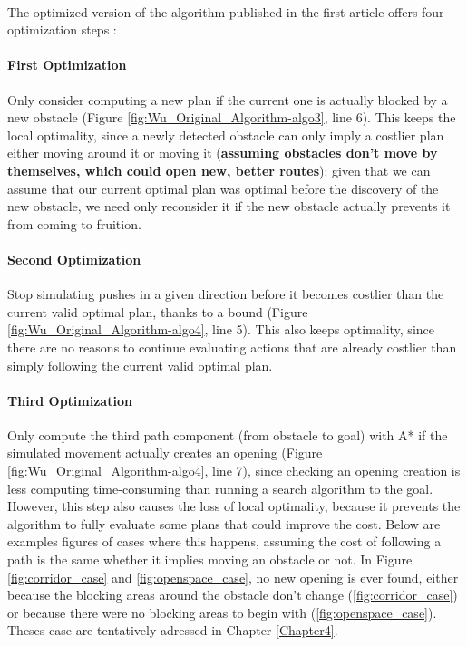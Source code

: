 \paragraph{} The optimized version of the algorithm published in the first article offers four optimization steps :

\paragraph{First Optimization}\label{optimization_1} Only consider computing a new plan if the current one is actually blocked by a new obstacle (Figure \ref{fig:Wu_Original_Algorithm-algo3}, line 6). This keeps the local optimality, since a newly detected obstacle can only imply a costlier plan either moving around it or moving it (\textbf{assuming obstacles don't move by themselves, which could open new, better routes}): given that we can assume that our current optimal plan was optimal before the discovery of the new obstacle, we need only reconsider it if the new obstacle actually prevents it from coming to fruition.

\paragraph{Second Optimization}\label{optimization_2} Stop simulating pushes in a given direction before it becomes costlier than the current valid optimal plan, thanks to a bound (Figure \ref{fig:Wu_Original_Algorithm-algo4}, line 5). This also keeps optimality, since there are no reasons to continue evaluating actions that are already costlier than simply following the current valid optimal plan.

\paragraph{Third Optimization}\label{optimization_3} Only compute the third path component (from obstacle to goal) with A* if the simulated movement actually creates an opening (Figure \ref{fig:Wu_Original_Algorithm-algo4}, line 7), since checking an opening creation is less computing time-consuming than running a search algorithm to the goal. However, this step also causes the loss of local optimality, because it prevents the algorithm to fully evaluate some plans that could improve the cost. Below are examples figures of cases where this happens, assuming the cost of following a path is the same whether it implies moving an obstacle or not. In Figure \ref{fig:corridor_case} and \ref{fig:openspace_case}, no new opening is ever found, either because the blocking areas around the obstacle don't change (\ref{fig:corridor_case}) or because there were no blocking areas to begin with (\ref{fig:openspace_case}). Theses case are tentatively adressed in Chapter \ref{Chapter4}.

